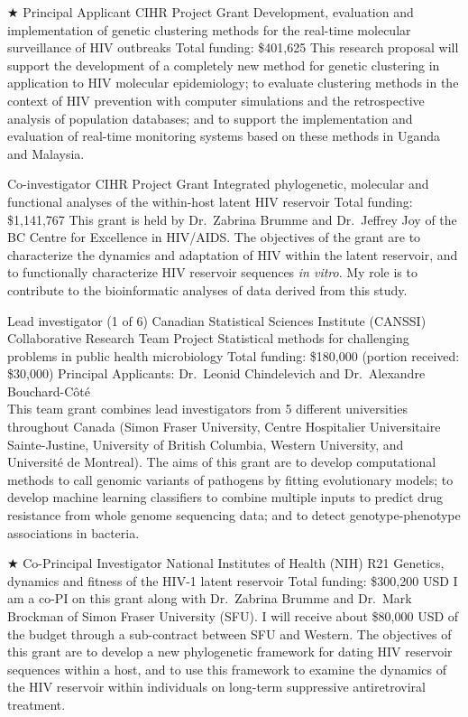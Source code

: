 {$\bigstar$ Principal Applicant}
{CIHR Project Grant} %
{Development, evaluation and implementation of genetic clustering methods for the real-time molecular surveillance of HIV outbreaks}
{Total funding: \$401,625}
{
This research proposal will support the development of a completely new method for genetic clustering in application to HIV molecular epidemiology; 
to evaluate clustering methods in the context of HIV prevention with computer simulations and the retrospective analysis of population databases; 
and to support the implementation and evaluation of real-time monitoring systems based on these methods in Uganda and Malaysia.\\
}



{Co-investigator}
{CIHR Project Grant}  %
{Integrated phylogenetic, molecular and functional analyses of the within-host latent HIV reservoir}
{Total funding: \$1,141,767}
{
This grant is held by Dr.~Zabrina Brumme and Dr.~Jeffrey Joy of the BC Centre for Excellence in HIV/AIDS.
The objectives of the grant are to characterize the dynamics and adaptation of HIV within the latent reservoir, and to functionally characterize HIV reservoir sequences \textit{in vitro}.
My role is to contribute to the bioinformatic analyses of data derived from this study.
}

{Lead investigator (1 of 6)}
{Canadian Statistical Sciences Institute (CANSSI) Collaborative Research Team Project}
{Statistical   methods   for   challenging   problems   in   public   health   microbiology}
{Total funding: \$180,000 (portion received: \$30,000)}
{Principal Applicants: Dr.~Leonid Chindelevich and Dr.~Alexandre Bouchard-C\^ot\'e\\
This team grant combines lead investigators from 5 different universities throughout Canada (Simon Fraser University,  Centre Hospitalier Universitaire Sainte-Justine, University of British Columbia, Western University, and Universit\'e de Montreal).
The aims of this grant are to develop computational methods to call genomic variants of pathogens by fitting evolutionary models; to develop machine learning classifiers to combine multiple inputs to predict drug resistance from whole genome sequencing data; and to detect genotype-phenotype associations in bacteria.\\
}



{$\bigstar$ Co-Principal Investigator}
{National Institutes of Health (NIH) R21}  %
{Genetics, dynamics and fitness of the HIV-1 latent reservoir}
{Total funding: \$300,200 USD}
{
I am a co-PI on this grant along with Dr.~Zabrina Brumme and Dr.~Mark Brockman of Simon Fraser University (SFU).
I will receive about \$80,000 USD of the budget through a sub-contract between SFU and Western.
The objectives of this grant are to develop a new phylogenetic framework for dating HIV reservoir sequences within a host, and to use this framework to examine the dynamics of the HIV reservoir within individuals on long-term suppressive antiretroviral treatment.
}

